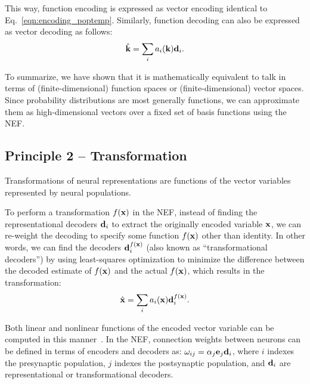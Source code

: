 \documentclass[10pt,letterpaper]{article}
\renewcommand{\vec}[1]{{\bf {#1}}}
\begin{document}
This way, function encoding is expressed as vector encoding identical to Eq.~\ref{eqn:encoding_poptemp}. Similarly, function decoding can also be expressed as vector decoding as follows:
\begin{equation}
\label{eqn:final_func_decoding}
\begin{aligned} 
\hat{\vec{k}} = \sum_i a_i(\vec{k}) \vec{d}_i .
\end{aligned}
\end{equation}

To summarize, we have shown that it is mathematically equivalent to talk in terms of (finite-dimensional) function spaces or (finite-dimensional) vector spaces. Since probability distributions are most generally functions, we can approximate them as high-dimensional vectors over a fixed set of basis functions using the NEF.

\subsection{Principle 2 -- Transformation}
Transformations of neural representations are functions of the vector variables represented by neural populations. 

To perform a transformation $f(\vec{x})$ in the NEF, instead of finding the representational decoders $\vec{d}_i$ to extract the originally encoded variable $\vec{x}$, we can re-weight the decoding to specify some function $f(\vec{x})$ other than identity. In other words, we can find the decoders $\vec{d}_i^{f(\vec{x})}$ (also known as ``transformational decoders'') by using least-squares optimization to minimize the difference between the decoded estimate of $f(\vec{x})$ and the actual $f(\vec{x})$, which results in the transformation: %
\begin{equation}
\label{eqn:decoding_transform}
\begin{aligned}
\hat{\vec{x}} = \sum_i a_i(\vec{x})\vec{d}_i^{f(\vec{x})} .
\end{aligned}
\end{equation}

Both linear and nonlinear functions of the encoded vector variable can be computed in this manner~\cite{eliasmith2003neural}. In the NEF, connection weights between neurons can be defined in terms of encoders and decoders as: $\omega_{ij} = \alpha_j \vec{e}_j \vec{d}_i$, where $i$ indexes the presynaptic population, $j$ indexes the postsynaptic population, and $\vec{d}_i$ are representational or transformational decoders.
\end{document}
